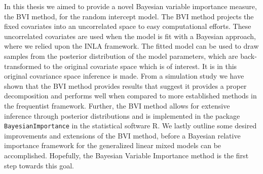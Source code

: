 In this thesis we aimed to provide a novel Bayesian variable importance measure, the BVI method, for the random intercept model. 
The BVI method projects the fixed covariates into an uncorrelated space to easy computational efforts. 
These uncorrelated covariates are used when the model is fit with a Bayesian approach, where we relied upon the INLA framework.
The fitted model can be used to draw samples from the posterior distribution of the model parameters, which are back-transformed to the original covariate space which is of interest.
It is in this original covariance space inference is made.
\newline
\newline
From a simulation study we have shown that the BVI method provides results that suggest it provides a proper decomposition and performs well when compared to more established methods in the frequentist framework.
Further, the BVI method allows for extensive inference through posterior distributions and is implemented in the package \texttt{BayesianImportance} in the statistical software R.
We lastly outline some desired improvements and extensions of the BVI method, before a Bayesian relative importance framework for the generalized linear mixed models can be accomplished.
Hopefully, the Bayesian Variable Importance method is the first step towards this goal.